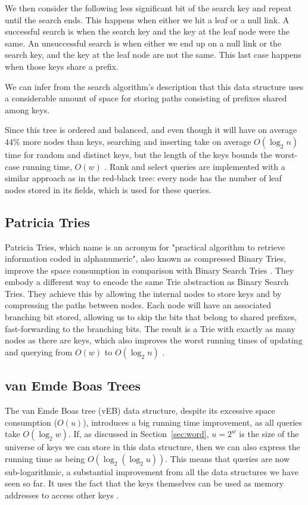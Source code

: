 We then consider the following less significant bit of the search key and repeat until the search ends.
This happens when either we hit a leaf or a null link.
A successful search is when the search key and the key at the leaf node were the same.
An unsuccessful search is when either we end up on a null link or the search key, and the key at the leaf node are not the same.
This last case happens when those keys share a prefix.

We can infer from the search algorithm's description that this data structure uses a considerable amount of space for storing paths consisting of prefixes shared among keys.

Since this tree is ordered and balanced, and even though it will have on average $44\%$ more nodes than keys, searching and inserting take on average $O(\log_2 n)$ time for random and distinct keys, but the length of the keys bounds the worst-case running time, $O(w)$ \cite{sedgewick2002algorithms}.
Rank and select queries are implemented with a similar approach as in the red-black tree: every node has the number of leaf nodes stored in its fields, which is used for these queries.

\subsection{Patricia Tries}

Patricia Tries, which name is an acronym for "practical algorithm to retrieve information coded in alphanumeric", also known as compressed Binary Tries, improve the space consumption in comparison with Binary Search Tries \cite{sedgewick2002algorithms}.
They embody a different way to encode the same Trie abstraction as Binary Search Tries.
They achieve this by allowing the internal nodes to store keys and by compressing the paths between nodes.
Each node will have an associated branching bit stored, allowing us to skip the bits that belong to shared prefixes, fast-forwarding to the branching bits.
The result is a Trie with exactly as many nodes as there are keys, which also improves the worst running times of updating and querying from $O(w)$ to $O(\log_2 n)$ \cite{sedgewick2002algorithms}.

\subsection{van Emde Boas Trees}

The van Emde Boas tree (vEB) data structure, despite its excessive space consumption ($O(u)$), introduces a big running time improvement, as all queries take $O(\log_2 w)$.
If, as discussed in Section~\ref{sec:word}, $u = 2^w$ is the size of the universe of keys we can store in this data structure, then we can also express the running time as being $O(\log_2(\log_2 u))$.
This means that queries are now sub-logarithmic, a substantial improvement from all the data structures we have seen so far.
It uses the fact that the keys themselves can be used as memory addresses to access other keys \cite{nelsonjelanilec1}.

